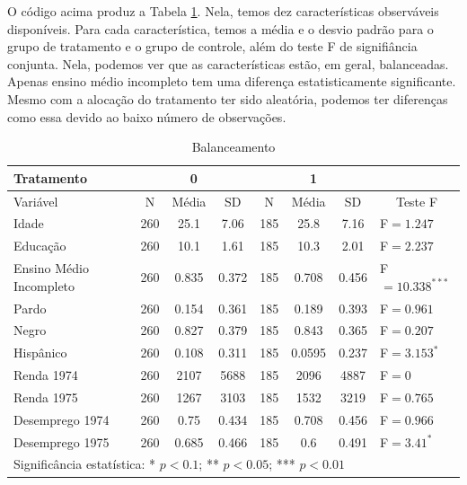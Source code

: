O código acima produz a Tabela \ref{balance}. Nela, temos dez características observáveis disponíveis. Para cada característica, temos a média e o desvio padrão para o grupo de tratamento e o grupo de controle, além do teste F de signifiância conjunta. Nela, podemos ver que as características estão, em geral, balanceadas. Apenas ensino médio incompleto tem uma diferença estatisticamente significante. Mesmo com a alocação do tratamento ter sido aleatória, podemos ter diferenças como essa devido ao baixo número de observações.

\begin{table}[!htbp] \centering \caption{Balanceamento}\label{balance}
\begin{tabular}{lccccccl}
\toprule
Tratamento & \multicolumn{3}{c}{0} & \multicolumn{3}{c}{1} &   \\
  \midrule
 Variável & \multicolumn{1}{c}{N} & \multicolumn{1}{c}{Média} & \multicolumn{1}{c}{SD} & \multicolumn{1}{c}{N} & \multicolumn{1}{c}{Média} & \multicolumn{1}{c}{SD} & \multicolumn{1}{c}{Teste F} \\ 
\midrule
Idade \hspace{70mm}& 260 & 25.1 & 7.06 & 185 & 25.8 & 7.16 & F$=1.247^{}$ \\ 
Educação & 260 & 10.1 & 1.61 & 185 & 10.3 & 2.01 & F$=2.237^{}$ \\ 
Ensino Médio Incompleto & 260 & 0.835 & 0.372 & 185 & 0.708 & 0.456 & F$=10.338^{***}$ \\ 
Pardo & 260 & 0.154 & 0.361 & 185 & 0.189 & 0.393 & F$=0.961^{}$ \\ 
Negro & 260 & 0.827 & 0.379 & 185 & 0.843 & 0.365 & F$=0.207^{}$ \\ 
Hispânico & 260 & 0.108 & 0.311 & 185 & 0.0595 & 0.237 & F$=3.153^{*}$ \\ 
Renda 1974 & 260 & 2107 & 5688 & 185 & 2096 & 4887 & F$=0^{}$ \\ 
Renda 1975 & 260 & 1267 & 3103 & 185 & 1532 & 3219 & F$=0.765^{}$ \\ 
Desemprego 1974 & 260 & 0.75 & 0.434 & 185 & 0.708 & 0.456 & F$=0.966^{}$ \\ 
Desemprego 1975 & 260 & 0.685 & 0.466 & 185 & 0.6 & 0.491 & F$=3.41^{*}$\\ 
\midrule
\multicolumn{8}{l}{Significância estatística: * $p<0.1$; ** $p<0.05$; *** $p<0.01$}\\ 
\end{tabular}

\end{table}

